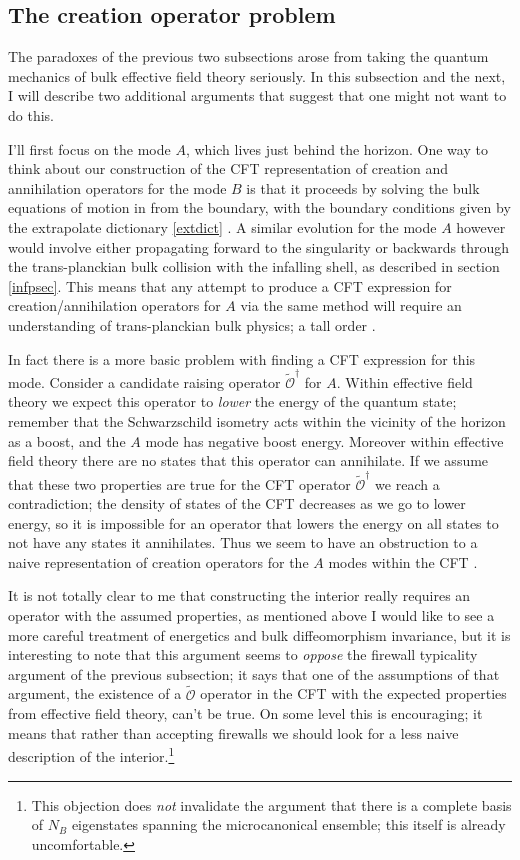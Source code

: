 \documentclass[12pt]{article}
\newcommand{\tO}{\widetilde{\mathcal{O}}}
\begin{document}
\subsection{The creation operator problem}
The paradoxes of the previous two subsections arose from taking the quantum mechanics of bulk effective field theory seriously.  In this subsection and the next, I will describe two additional arguments that suggest that one might not want to do this.  

I'll first focus on the mode $A$, which lives just behind the horizon.  One way to think about our construction of the CFT representation of creation and annihilation operators for the mode $B$ is that it proceeds by solving the bulk equations of motion in from the boundary, with the boundary conditions given by the extrapolate dictionary \eqref{extdict} \cite{Heemskerk:2012mn}.  A similar evolution for the mode $A$ however would involve either propagating forward to the singularity or backwards through the trans-planckian bulk collision with the infalling shell, as described in section \ref{infpsec}.  This means that any attempt to produce a CFT expression for creation/annihilation operators for $A$ via the same method will require an understanding of trans-planckian bulk physics; a tall order \cite{Almheiri:2013hfa}.  

In fact there is a more basic problem with finding a CFT expression for this mode.  Consider a candidate raising operator $\tO^\dagger$ for $A$.  Within effective field theory we expect this operator to \textit{lower} the energy of the quantum state; remember that the Schwarzschild isometry acts within the vicinity of the horizon as a boost, and the $A$ mode has negative boost energy.  Moreover within effective field theory there are no states that this operator can annihilate.  If we assume that these two properties are true for the CFT operator $\tO^\dagger$ we reach a contradiction; the density of states of the CFT decreases as we go to lower energy, so it is impossible for an operator that lowers the energy on all states to not have any states it annihilates.  Thus we seem to have an obstruction to a naive representation of creation operators for the $A$ modes within the CFT \cite{Almheiri:2013hfa}.

It is not totally clear to me that constructing the interior really requires an operator with the assumed properties, as mentioned above I would like to see a more careful treatment of energetics and bulk diffeomorphism invariance, but it is interesting to note that this argument seems to \textit{oppose} the firewall typicality argument of the previous subsection; it says that one of the assumptions of that argument, the existence of a $\tO$ operator in the CFT with the expected properties from effective field theory, can't be true.  On some level this is encouraging; it means that rather than accepting firewalls we should look for a less naive description of the interior.\footnote{This objection does \textit{not} invalidate the argument that there is a complete basis of $N_B$ eigenstates spanning the microcanonical ensemble; this itself is already uncomfortable.}  
\end{document}
